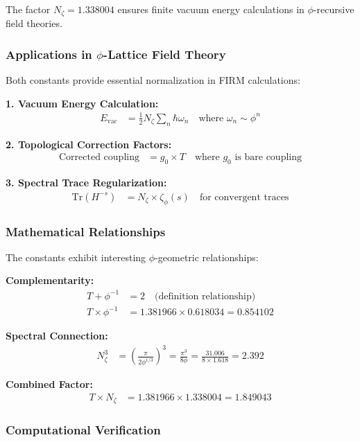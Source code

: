 The factor $N_\zeta = 1.338004$ ensures finite vacuum energy calculations in $\phi$-recursive field theories.

\subsubsection{Applications in $\phi$-Lattice Field Theory}

Both constants provide essential normalization in FIRM calculations:

\textbf{1. Vacuum Energy Calculation:}
\begin{align}
E_{\text{vac}} &= \frac{1}{2} N_\zeta \sum_{n} \hbar \omega_n \quad \text{where } \omega_n \sim \phi^n
\end{align}

\textbf{2. Topological Correction Factors:}
\begin{align}
\text{Corrected coupling} &= g_0 \times T \quad \text{where } g_0 \text{ is bare coupling}
\end{align}

\textbf{3. Spectral Trace Regularization:}
\begin{align}
\text{Tr}(H^{-s}) &= N_\zeta \times \zeta_\phi(s) \quad \text{for convergent traces}
\end{align}

\subsubsection{Mathematical Relationships}

The constants exhibit interesting $\phi$-geometric relationships:

\textbf{Complementarity:}
\begin{align}
T + \phi^{-1} &= 2 \quad \text{(definition relationship)} \\
T \times \phi^{-1} &= 1.381966 \times 0.618034 = 0.854102
\end{align}

\textbf{Spectral Connection:}
\begin{align}
N_\zeta^3 &= \left(\frac{\pi}{2\phi^{1/3}}\right)^3 = \frac{\pi^3}{8\phi} = \frac{31.006}{8 \times 1.618} = 2.392
\end{align}

\textbf{Combined Factor:}
\begin{align}
T \times N_\zeta &= 1.381966 \times 1.338004 = 1.849043
\end{align}

\subsubsection{Computational Verification}

